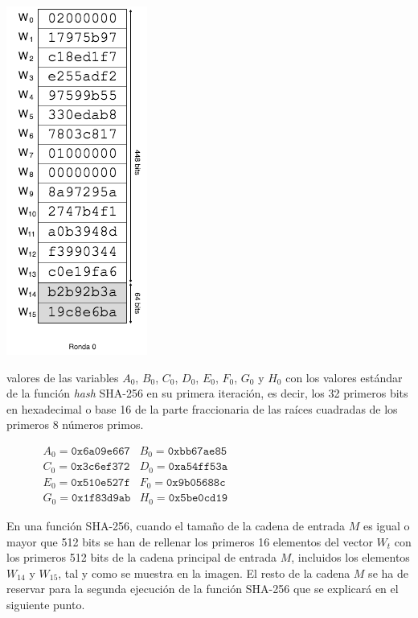 \documentclass{article}
\begin{document}
        \noindent\begin{minipage}{0.23\textwidth}
        \includegraphics[scale=0.59]{img/Bitcoin_block_SHA_256_W0_W15_ronda_0}
        \end{minipage}
        \hfill
        \begin{minipage}{0.67\textwidth}
         valores de las variables $A_{0}$, $B_{0}$, $C_{0}$, $D_{0}$, $E_{0}$, $F_{0}$, $G_{0}$ y $H_{0}$ con los valores estándar de la función \textit{hash} SHA-256 en su primera iteración, es decir, los 32 primeros bits en hexadecimal o base 16 de la parte fraccionaria de las raíces cuadradas de los primeros 8 números primos.
        
        \begin{figure}[H]
        \centering
            $\begin{array}{rr}
                A_{0} = \texttt{0x6a09e667} & B_{0} = \texttt{0xbb67ae85} \\
                C_{0} = \texttt{0x3c6ef372} & D_{0} = \texttt{0xa54ff53a} \\
                E_{0} = \texttt{0x510e527f} & F_{0} = \texttt{0x9b05688c} \\
                G_{0} = \texttt{0x1f83d9ab} & H_{0} = \texttt{0x5be0cd19}
            \end{array}$
        \end{figure}
        
        En una función SHA-256, cuando el tamaño de la cadena de entrada $M$ es igual o mayor que 512 bits se han de rellenar los primeros 16 elementos del vector $W_t$ con los primeros 512 bits de la cadena principal de entrada $M$, incluidos los elementos $W_{14}$ y $W_{15}$, tal y como se muestra en la imagen. El resto de la cadena $M$ se ha de reservar para la segunda ejecución de la función SHA-256 que se explicará en el siguiente punto.
        \end{minipage}
        
\end{document}
